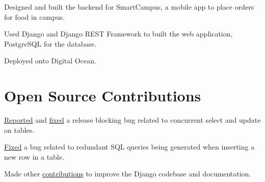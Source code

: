 \documentclass[]{resume}
\begin{document}
\begin{minipage}[t]{0.70\textwidth}
\begin{tightemize}
 \item Designed and built the backend for SmartCampus, a mobile app to place orders for food in campus.
 \item Used Django and Django REST Framework to built the web application, PostgreSQL for the database.
 \item Deployed onto Digital Ocean.
\end{tightemize}
\primarysectionsep  %

\section{Open Source Contributions}
\begin{tightemize}
\item \href{https://code.djangoproject.com/ticket/31246}{Reported} and \href{https://github.com/django/django/pull/12434}{fixed}
a release blocking bug related to concurrent select and update on tables.
\item \justifying\href{https://github.com/django/django/pull/12496}{Fixed} a bug related to redundant SQL queries being generated when
inserting a new row in a table.
\item \justifying Made other \href{https://github.com/django/django/pulls?q=author\%3Aabhijeetviswa}{contributions} to improve the Django codebase and
documentation.
\end{tightemize}
\primarysectionsep


 \end{minipage}
 
\end{document}
